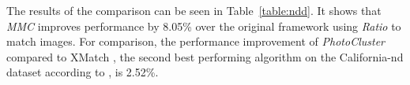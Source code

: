 The results of the comparison can be seen in Table~\ref{table:ndd}. It 
shows that \emph{MMC} improves performance by 8.05\% over the original 
framework using \emph{Ratio} to match images. For comparison, the 
performance improvement of \emph{PhotoCluster} compared to XMatch 
\cite{zhao2009scale}, the second best performing algorithm on the 
California-nd dataset according to \cite{vas2013cluster}, is 2.52\%.
